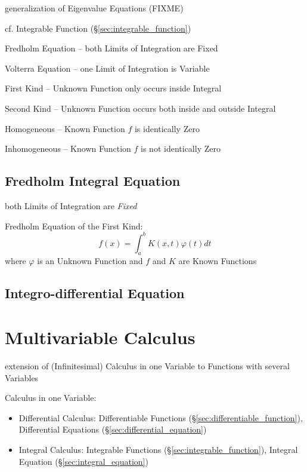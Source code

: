 generalization of Eigenvalue Equations (FIXME)

cf. Integrable Function (\S\ref{sec:integrable_function})

Fredholm Equation -- both Limits of Integration are Fixed

Volterra Equation -- one Limit of Integration is Variable

First Kind -- Unknown Function only occurs inside Integral

Second Kind -- Unknown Function occurs both inside and outside Integral

Homogeneous -- Known Function $f$ is identically Zero

Inhomogeneous -- Known Function $f$ is not identically Zero



\subsection{Fredholm Integral Equation}\label{sec:fredholm_integral}

both Limits of Integration are \emph{Fixed}

Fredholm Equation of the First Kind:
\[
  f(x) = \int_a^b K(x,t) \varphi(t) dt
\]
where $\varphi$ is an Unknown Function and $f$ and $K$ are Known Functions



\subsection{Integro-differential Equation}\label{sec:integro_differential}



\section{Multivariable Calculus}\label{sec:multivariable_calculus}

extension of (Infinitesimal) Calculus in one Variable to Functions with several
Variables

Calculus in one Variable:
\begin{itemize}
\item Differential Calculus: Differentiable Functions
  (\S\ref{sec:differentiable_function}), Differential Equations
  (\S\ref{sec:differential_equation})
\item Integral Calculus: Integrable Functions
  (\S\ref{sec:integrable_function}), Integral Equation
  (\S\ref{sec:integral_equation})
\end{itemize}

